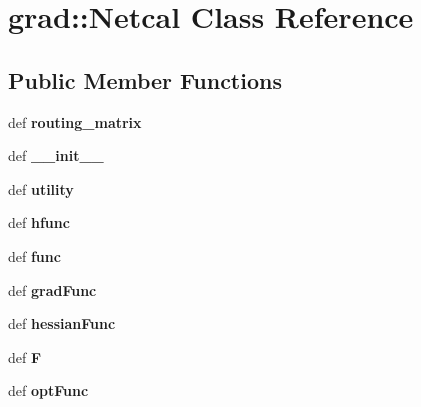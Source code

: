 \hypertarget{classgrad_1_1Netcal}{
\section{grad::Netcal Class Reference}
\label{classgrad_1_1Netcal}
}
\subsection*{Public Member Functions}
\begin{DoxyCompactItemize}
\item 
\hypertarget{classgrad_1_1Netcal_aafbef4493c8e48593a99aa61fb43692f}{
def {\bfseries routing\_\-matrix}}
\label{classgrad_1_1Netcal_aafbef4493c8e48593a99aa61fb43692f}

\item 
\hypertarget{classgrad_1_1Netcal_aa79a6e21ae82120d43f1389c4d8fbbd2}{
def {\bfseries \_\-\_\-init\_\-\_\-}}
\label{classgrad_1_1Netcal_aa79a6e21ae82120d43f1389c4d8fbbd2}

\item 
\hypertarget{classgrad_1_1Netcal_ae3257cd2f4777b1763dade7aca8a4518}{
def {\bfseries utility}}
\label{classgrad_1_1Netcal_ae3257cd2f4777b1763dade7aca8a4518}

\item 
\hypertarget{classgrad_1_1Netcal_aed993192e8022b3f1b6e85a5df1af8d5}{
def {\bfseries hfunc}}
\label{classgrad_1_1Netcal_aed993192e8022b3f1b6e85a5df1af8d5}

\item 
\hypertarget{classgrad_1_1Netcal_a6ef8c568abfbd0930514f9a9a51206c9}{
def {\bfseries func}}
\label{classgrad_1_1Netcal_a6ef8c568abfbd0930514f9a9a51206c9}

\item 
\hypertarget{classgrad_1_1Netcal_ac00ce40148bae5c6060bc481a66e81d0}{
def {\bfseries gradFunc}}
\label{classgrad_1_1Netcal_ac00ce40148bae5c6060bc481a66e81d0}

\item 
\hypertarget{classgrad_1_1Netcal_abc3989a2b626beef82ae67f2b3e2fb51}{
def {\bfseries hessianFunc}}
\label{classgrad_1_1Netcal_abc3989a2b626beef82ae67f2b3e2fb51}

\item 
\hypertarget{classgrad_1_1Netcal_a58ccbb016e4c53c61120e3c67934bfea}{
def {\bfseries F}}
\label{classgrad_1_1Netcal_a58ccbb016e4c53c61120e3c67934bfea}

\item 
\hypertarget{classgrad_1_1Netcal_ad1bfd1cec4af1e31e262a650ac8663c4}{
def {\bfseries optFunc}}
\label{classgrad_1_1Netcal_ad1bfd1cec4af1e31e262a650ac8663c4}

\end{DoxyCompactItemize}
